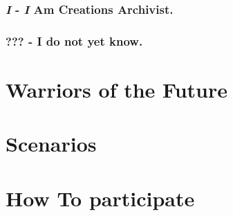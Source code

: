 \documentclass[a4paper,14pt]{book}
\begin{document}
\subsection{\textit{I} - \textit{I} Am Creations Archivist.}

\subsection{??? - I do not yet know.}

\chapter{Warriors of the Future}

\chapter{Scenarios}

\chapter{How To participate}
\end{document}

